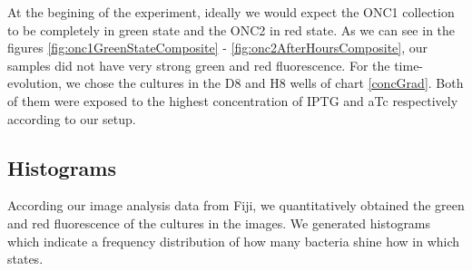 \documentclass[english,11pt,a4paper]{article}
\begin{document}
At the begining of the experiment, ideally we would expect the ONC1 collection to be completely in green state and the ONC2 in red state. As we can see in the figures \ref{fig:onc1GreenStateComposite} - \ref{fig:onc2AfterHoursComposite}, our samples did not have very strong green and red fluorescence. For the time-evolution, we chose the cultures in the D8 and H8 wells of chart \ref{concGrad}. Both of them were exposed to the highest concentration of IPTG and aTc respectively according to our setup. 

\pagebreak
\subsection{Histograms}
According our image analysis data from Fiji, we quantitatively obtained the green and red fluorescence of the cultures in the images. We generated histograms which indicate a frequency distribution of how many bacteria shine how in which states. 
\end{document}

